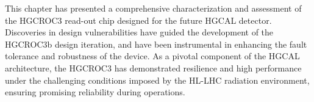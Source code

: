 This chapter has presented a comprehensive characterization and assessment of the HGCROC3 read-out chip designed for the future HGCAL detector. Discoveries in design vulnerabilities have guided the development of the HGCROC3b design iteration, and have been instrumental in enhancing the fault tolerance and robustness of the device.
As a pivotal component of the HGCAL architecture, the HGCROC3 has demonstrated resilience and high performance under the challenging conditions imposed by the HL-LHC radiation environment, ensuring promising reliability during operations.
